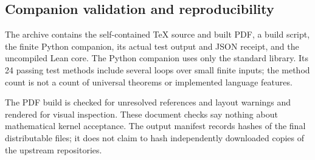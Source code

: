 \documentclass[11pt,a4paper]{article}
\theoremstyle{plain}
\theoremstyle{definition}
\theoremstyle{remark}
\begin{document}
\subsection{Companion validation and reproducibility}
The archive contains the self-contained TeX source and built PDF, a build
script, the finite Python companion, its actual test output and JSON receipt,
and the uncompiled Lean core. The Python companion uses only the standard
library. Its 24 passing test methods include several loops over small finite
inputs; the method count is not a count of universal theorems or implemented
language features.

The PDF build is checked for unresolved references and layout warnings and
rendered for visual inspection. These document checks say nothing about
mathematical kernel acceptance. The output manifest records hashes of the
final distributable files; it does not claim to hash independently downloaded
copies of the upstream repositories.
\end{document}
